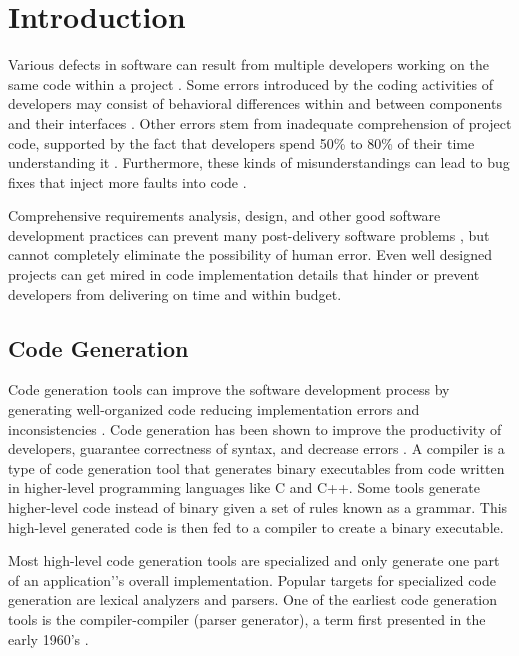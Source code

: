 \chapter{Introduction}
Various defects in software can result from multiple developers working on the same code within a project \cite{livshits_01}.  Some errors introduced by the coding activities of developers may consist of behavioral differences within and between components and their interfaces \cite{leveson_01,smidts_01,nakajo_01}.  Other errors stem from inadequate comprehension of project code, supported by the fact that developers spend 50\% to 80\% of their time understanding it \cite{sinha_01}.  Furthermore, these kinds of misunderstandings can lead to bug fixes that inject more faults into code \cite{smidts_01}.

\indent
Comprehensive requirements analysis, design, and other good software development practices can prevent many post-delivery software problems \cite{boehm_01}, but cannot completely eliminate the possibility of human error.  Even well designed projects can get mired in code implementation details that hinder or prevent developers from delivering on time and within budget.

\section{Code Generation}
Code generation tools can improve the software development process by generating well-organized code reducing implementation errors and inconsistencies \cite{boysen_01}.  Code generation has been shown to improve the productivity of developers, guarantee correctness of syntax, and decrease errors \cite{groher_01}.  A compiler is a type of code generation tool that generates binary executables from code written in higher-level programming languages like C and C++.   Some tools generate higher-level code instead of binary given a set of rules known as a grammar.  This high-level generated code is then fed to a compiler to create a binary executable.

\indent
Most high-level code generation tools are specialized and only generate one part of an application'’s overall implementation.  Popular targets for specialized code generation are lexical analyzers and parsers.  One of the earliest code generation tools is the compiler-compiler (parser generator), a term first presented in the early 1960’s \cite{brooker_01}.


